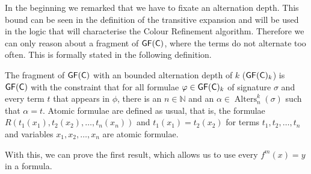 In the beginning we remarked that we have to fixate an alternation depth.
This bound can be seen in the definition of the transitive expansion and will be used in the logic that will characterise the Colour Refinement algorithm.
Therefore we can only reason about a fragment of $\mathsf{GF}(\mathsf{C})$, where the terms do not alternate too often.
This is formally stated in the following definition.

\begin{definition}
	The fragment of $\mathsf{GF}(\mathsf{C})$ with an bounded alternation depth of $k$ ($\mathsf{GF}(\mathsf{C})_k$) is $\mathsf{GF}(\mathsf{C})$ with the constraint that for all formulae $\varphi\in\mathsf{GF}(\mathsf{C})_k$ of signature $\sigma$ and every term $t$ that appears in $\phi$, there is an $n\in \mathbb{N}$ and an $\alpha\in \operatorname{Alters}_n^k(\sigma)$ such that $\alpha=t$.
	Atomic formulae are defined as usual, that is, the formulae $R(t_1(x_1),t_2(x_2),\dots,t_n(x_n))$ and $t_1(x_1)=t_2(x_2)$ for terms $t_1,t_2,\dots,t_n$ and variables $x_1,x_2,\dots,x_n$ are atomic formulae.
\end{definition}

With this, we can prove the first result, which allows us to use every $f^m(x)=y$ in a formula.

